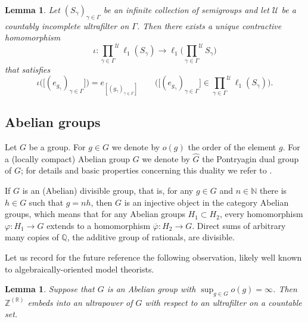 \documentclass[12pt,fleqn]{amsart}
\newtheorem{lemma}[theorem]{Lemma}
\theoremstyle{definition}
\numberwithin{equation}{section}
\theoremstyle{remark}
\begin{document}
\begin{lemma}
    Let $(S_\gamma)_{\gamma\in \Gamma}$ be an infinite collection of semigroups and let $\mathscr{U}$ be a countably incomplete ultrafilter on $\Gamma$. Then there exists a unique contractive homomorphism
    \begin{equation}\label{homomorphismG}
        \iota \colon {\prod_{\gamma\in \Gamma}}^{\mathscr{U}}\ell_1(S_\gamma)\to \ell_1\Big({\prod_{\gamma\in \Gamma}}^{\mathscr{U}}S_\gamma \Big) 
    \end{equation}
    that satisfies 
    \[
        \iota\Big(\big[(e_{g_\gamma})_{\gamma\in\Gamma}\big]\Big) = e_{[(g_\gamma)_{\gamma\in\Gamma}]}\qquad \Big(\big[(e_{g_\gamma})_{\gamma\in\Gamma}\big]\in {\prod_{\gamma\in \Gamma}}^{\mathscr U}\ell_1(S_\gamma)\Big).
    \]
\end{lemma}


\subsection{Abelian groups} Let $G$ be a group. For $g\in G$ we denote by $o(g)$ the order of the element $g$. For a (locally compact) Abelian group $G$ we denote by $\widehat{G}$ the Pontryagin dual group of $G$; for details and basic properties concerning this duality we refer to \cite[Chapter 6]{hewitt2012abstract}.
 
If $G$ is an (Abelian) divisible group, that is, for any $g\in G$ and $n\in \mathbb N$ there is $h\in G$ such that $g = nh$, then $G$ is an injective object in the category Abelian groups, which means that for any Abelian groups $H_1 \subset H_2$, every homomorphism $\varphi\colon H_1\to G$ extends to a homomorphism $\overline{\varphi}\colon H_2\to G$. Direct sums of arbitrary many copies of $\mathbb Q$, the additive group of rationals, are divisible. \smallskip

Let us record for the future reference the following observation, likely well known to alge\-bra\-ically-orien\-ted model theorists.

\begin{lemma}\label{lem:idempotent}
    Suppose that $G$ is an Abelian group with $\sup_{g\in G} o(g) = \infty$. Then $\mathbb Z^{(\mathbb R)}$ embeds into an ultrapower of $G$ with respect to an ultrafilter on a countable set.
\end{lemma}
\end{document}
